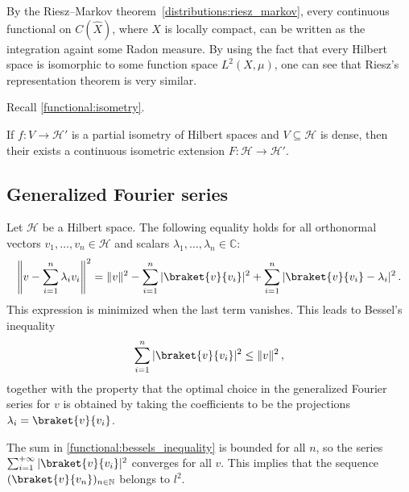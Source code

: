     \begin{remark}
        By the Riesz--Markov theorem~\ref{distributions:riesz_markov}, every continuous functional on $C(\widehat{X})$, where $X$ is locally compact, can be written as the integration againt some Radon measure. By using the fact that every Hilbert space is isomorphic to some function space $L^2(X,\mu)$, one can see that Riesz's representation theorem is very similar.
    \end{remark}

    Recall \cref{functional:isometry}.
    \begin{property}[Isometries]\label{functional:isometry_extension}
        If $f:V\rightarrow\mathcal{H}'$ is a partial isometry of Hilbert spaces and $V\subseteq\mathcal{H}$ is dense, then their exists a continuous isometric extension $F:\mathcal{H}\rightarrow\mathcal{H}'$.
    \end{property}

\subsection{Generalized Fourier series}

    \begin{property}
        Let $\mathcal{H}$ be a Hilbert space. The following equality holds for all orthonormal vectors $v_1,\ldots,v_n\in\mathcal{H}$ and scalars $\lambda_1,\ldots,\lambda_n\in\mathbb{C}$:
        \begin{gather}
            \left\|v - \sum_{i=1}^n\lambda_iv_i\right\|^2 = \|v\|^2 - \sum_{i=1}^n|\braket{v}{v_i}|^2 + \sum_{i=1}^n|\braket{v}{v_i} - \lambda_i|^2\,.
        \end{gather}
        This expression is minimized when the last term vanishes. This leads to Bessel's inequality
        \begin{gather}
            \label{functional:bessels_inequality}
            \sum_{i=1}^n|\braket{v}{v_i}|^2\leq\|v\|^2\,,
        \end{gather}
        together with the property that the optimal choice in the generalized Fourier series for $v$ is obtained by taking the coefficients to be the projections $\lambda_i=\braket{v}{v_i}$.
    \end{property}
    \begin{result}
        The sum in \cref{functional:bessels_inequality} is bounded for all $n$, so the series $\sum_{i=1}^{+\infty}|\braket{v}{v_i}|^2$ converges for all $v$. This implies that the sequence $(\braket{v}{v_n})_{n\in\mathbb{N}}$ belongs to $l^2$.
    \end{result}

